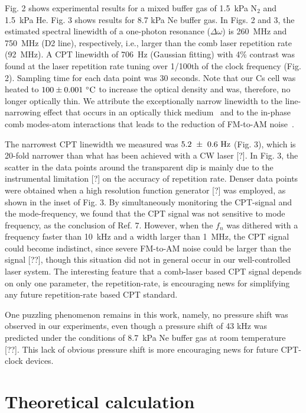 \documentclass[%
aps,
prl,
showpacs,
twocolumn,
]{revtex4}
\begin{document}
Fig. 2 shows experimental results for a mixed buffer gas of 1.5~kPa N$_2$ and 1.5~kPa He. Fig. 3 shows results for 8.7 kPa Ne buffer gas. In Figs. 2 and 3, the estimated spectral linewidth of a one-photon resonance ($\Delta \omega$) is 260~MHz and 750~MHz (D2 line), 
respectively, i.e., larger than the comb laser repetition rate (92~MHz). A CPT 
linewidth of 706~Hz (Gaussian fitting) with 4\% contrast was found at the laser 
repetition rate tuning over 1/100th of the clock frequency (Fig. 2). Sampling 
time for each data point was 30 seconds. Note that our Cs cell was heated to 
$100\pm0.001~^{\circ}{\rm C}$ to increase the optical density and was, therefore, no longer optically 
thin. We attribute the exceptionally narrow linewidth to the line-narrowing effect 
that occurs in an optically thick medium~\cite{Camparo1999, Knappe2001} and to the in-phase comb modes-atom 
interactions that leads to the reduction of FM-to-AM noise~\cite{Kao2005}. 

The narrowest CPT linewidth we measured was $5.2~\pm~0.6~{\rm Hz}$ (Fig. 3), which is 20-fold 
narrower than what has been achieved with a CW laser [?]. In Fig. 3, the 
scatter in the data points around the transparent dip is mainly due to the 
instrumental limitation [?] on the accuracy of repetition rate. Denser data 
points were obtained when a high resolution function generator [?] was employed, 
as shown in the inset of Fig. 3. By simultaneously monitoring the CPT-signal and
the mode-frequency, we found that the CPT signal was not sensitive to mode frequency, 
as the conclusion of Ref. 7. However, when the $f_n$ was dithered with a frequency faster 
than 10~kHz and a width larger than 1~MHz, the CPT signal could become indistinct, 
since severe FM-to-AM noise could be larger than the signal [??], though this situation did not in general occur in our well-controlled 
laser system. The interesting feature that a comb-laser based CPT signal depends on
 only one parameter, the repetition-rate, is encouraging news for 
simplifying any future repetition-rate based CPT standard. 

One puzzling phenomenon remains in this work, namely, no pressure shift was observed 
in our experiments, even though a pressure shift of 43 kHz was predicted under the 
conditions of 8.7~kPa Ne buffer gas at room temperature [??]. This lack of obvious pressure shift is more encouraging news for future 
CPT-clock devices.

\section{Theoretical calculation}
\end{document}
